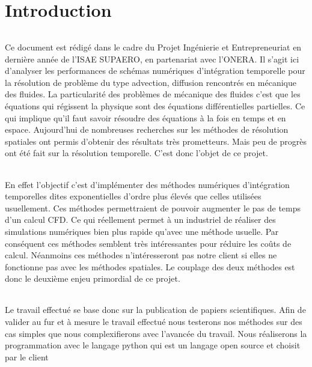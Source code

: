 \part*{Introduction}

\paragraph{}
Ce document est rédigé dans le cadre du Projet Ingénierie et Entrepreneuriat en dernière année de l'ISAE SUPAERO, en partenariat avec l'ONERA. Il s'agit ici d'analyser les performances de schémas numériques d’intégration
temporelle pour la résolution de problème du type advection, diffusion rencontrés en mécanique des fluides. La particularité des problèmes de mécanique des fluides c'est que les équations qui régissent la physique sont des équations différentielles partielles. Ce qui implique qu'il faut savoir résoudre des équations à la fois en temps et en espace. Aujourd'hui de nombreuses recherches sur les méthodes de résolution spatiales ont permis d'obtenir des résultats très prometteurs. Mais peu de progrès ont été fait sur la résolution temporelle. C'est donc l'objet de ce projet.

\paragraph{}
En effet l'objectif c'est d'implémenter des méthodes numériques d'intégration temporelles dites \og exponentielles \fg{} d'ordre plus élevés que celles utilisées usuellement.  Ces méthodes permettraient de pouvoir augmenter le pas de temps d'un calcul CFD. Ce qui réellement permet à un industriel de réaliser des simulations numériques bien plus rapide qu'avec une méthode usuelle. Par conséquent ces méthodes semblent très intéressantes pour réduire les coûts de calcul. 
Néanmoins ces méthodes n'intéresseront pas notre client si elles ne fonctionne pas avec les méthodes spatiales. Le couplage des deux méthodes est donc le deuxième enjeu primordial de ce projet.

\paragraph{}
Le travail effectué se base donc sur la publication de papiers scientifiques. Afin de valider au fur et à mesure le travail effectué nous testerons nos méthodes sur des cas simples que nous complexifierons avec l'avancée du travail. Nous réaliserons la programmation avec le langage python qui est un langage open source et choisit par le client
